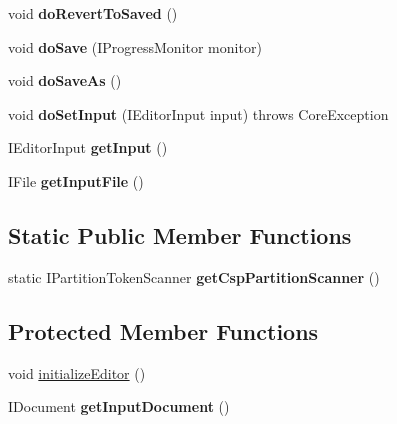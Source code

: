 \begin{DoxyCompactItemize}
void {\bfseries do\+Revert\+To\+Saved} ()
\item 
\mbox{\label{classcom_1_1fware_1_1cspdt_1_1cspm_1_1editor_1_1_csp_m_editor_af040d0153687c664e603aa5212b1766a}} 
void {\bfseries do\+Save} (I\+Progress\+Monitor monitor)
\item 
\mbox{\label{classcom_1_1fware_1_1cspdt_1_1cspm_1_1editor_1_1_csp_m_editor_a9f3057611bc4be7cbab5379c007b601a}} 
void {\bfseries do\+Save\+As} ()
\item 
\mbox{\label{classcom_1_1fware_1_1cspdt_1_1cspm_1_1editor_1_1_csp_m_editor_aa5065b94c9b663c467c61a6abc18cb5f}} 
void {\bfseries do\+Set\+Input} (I\+Editor\+Input input)  throws Core\+Exception 
\item 
\mbox{\label{classcom_1_1fware_1_1cspdt_1_1cspm_1_1editor_1_1_csp_m_editor_a5acfd1c735b4e25cd3a0c51f6ff01034}} 
I\+Editor\+Input {\bfseries get\+Input} ()
\item 
\mbox{\label{classcom_1_1fware_1_1cspdt_1_1cspm_1_1editor_1_1_csp_m_editor_a6ddd69ff4ac6af5857404bdddf6ca66f}} 
I\+File {\bfseries get\+Input\+File} ()
\end{DoxyCompactItemize}
\subsection*{Static Public Member Functions}
\begin{DoxyCompactItemize}
\item 
\mbox{\label{classcom_1_1fware_1_1cspdt_1_1cspm_1_1editor_1_1_csp_m_editor_a78fb9858c965be2dc3dbdda779c89fb6}} 
static I\+Partition\+Token\+Scanner {\bfseries get\+Csp\+Partition\+Scanner} ()
\end{DoxyCompactItemize}
\subsection*{Protected Member Functions}
\begin{DoxyCompactItemize}
\item 
void \hyperlink{classcom_1_1fware_1_1cspdt_1_1cspm_1_1editor_1_1_csp_m_editor_a5a7ce7c7cb07830ab01c15728a543347}{initialize\+Editor} ()
\item 
\mbox{\label{classcom_1_1fware_1_1cspdt_1_1cspm_1_1editor_1_1_csp_m_editor_ac89083d7cfdb1f57d2541845e61a7941}} 
I\+Document {\bfseries get\+Input\+Document} ()
\end{DoxyCompactItemize}


